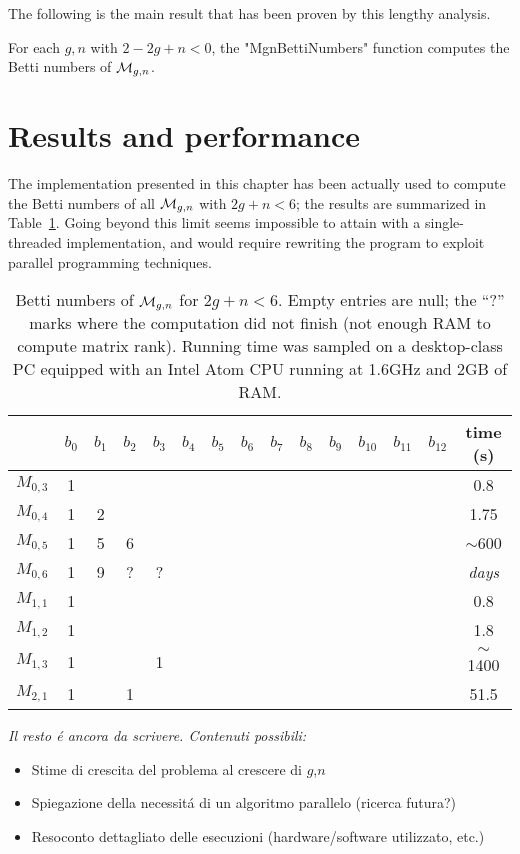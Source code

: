 The following is the main result that has been proven by this lengthy
analysis.
\begin{theorem}
  For each $g,n$ with $2-2g+n<0$, the "MgnBettiNumbers" function
  computes the Betti numbers of $\mathcal{M}_{g,n}$.
\end{theorem}


\section{Results and performance}
\label{sec:results}

The implementation presented in this chapter has been actually used to
compute the Betti numbers of all $\mathcal{M}_{g,n}$ with $2g+n<6$; the results
are summarized in Table~\ref{tab:results}.  Going beyond this limit
seems impossible to attain with a single-threaded implementation, and
would require rewriting the program to exploit parallel programming
techniques.
\begin{table}[hbt]
  \centering
  \begin{tabular}{cccccccccccccc|c}
    \toprule
           ~ & $b_0$ & $b_1$ & $b_2$ & $b_3$ & $b_4$ & $b_5$ & $b_6$ & $b_7$ & $b_8$ & $b_9$ & $b_{10}$ & $b_{11}$ & $b_{12}$ & time (s) \\
    \midrule
    $M_{0,3}$ & 1     &       &      &       &&&&&&&&&& 0.8 \\
    $M_{0,4}$ & 1     & 2     &      &       &&&&&&&&&& 1.75 \\
    $M_{0,5}$ & 1     & 5     & 6    &       &&&&&&&&&& $\sim$600 \\
    $M_{0,6}$ & 1     & 9     & ?    & ?     &&&&&&&&&& \emph{days} \\
    $M_{1,1}$ & 1     &       &      &       &&&&&&&&&& 0.8 \\
    $M_{1,2}$ & 1     &       &      &       &&&&&&&&&& 1.8 \\
    $M_{1,3}$ & 1     &       &      & 1     &&&&&&&&&& $\sim$1400 \\
    $M_{2,1}$ & 1     &       & 1    &       &&&&&&&&&& 51.5 \\
    \bottomrule
  \end{tabular}
  \caption{Betti numbers of $\mathcal{M}_{g,n}$ for $2g+n<6$.  Empty entries are null; the ``?'' marks where the computation did not finish (not enough RAM to compute matrix rank).  Running time was sampled on a desktop-class PC equipped with an Intel Atom CPU running at 1.6GHz and 2GB of RAM.}
  \label{tab:results}
\end{table}

{\em
Il resto \'e ancora da scrivere. Contenuti possibili:
\begin{itemize}
\item Stime di crescita del problema al crescere di $g$,$n$
\item Spiegazione della necessit\'a di un algoritmo parallelo (ricerca futura?)
\item Resoconto dettagliato delle esecuzioni (hardware/software utilizzato, etc.)
\end{itemize}}


